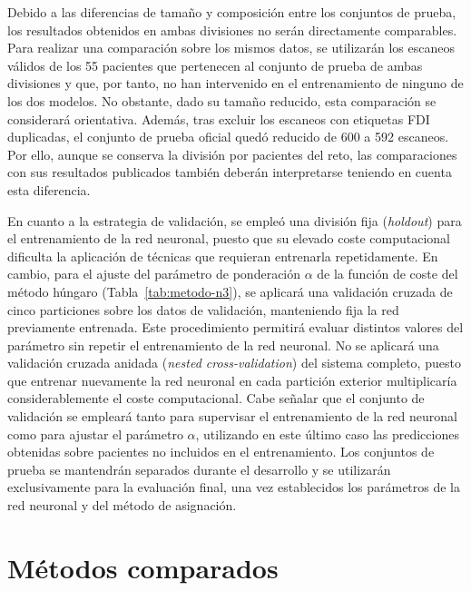 Debido a las diferencias de tamaño y composición entre los conjuntos de prueba, los resultados obtenidos en ambas divisiones no serán directamente comparables. Para realizar una comparación sobre los mismos datos, se utilizarán los escaneos válidos de los 55 pacientes que pertenecen al conjunto de prueba de ambas divisiones y que, por tanto, no han intervenido en el entrenamiento de ninguno de los dos modelos. No obstante, dado su tamaño reducido, esta comparación se considerará orientativa. Además, tras excluir los escaneos con etiquetas FDI duplicadas, el conjunto de prueba oficial quedó reducido de 600 a 592 escaneos. Por ello, aunque se conserva la división por pacientes del reto, las comparaciones con sus resultados publicados también deberán interpretarse teniendo en cuenta esta diferencia.

En cuanto a la estrategia de validación, se empleó una división fija (\textit{holdout}) para el entrenamiento de la red neuronal, puesto que su elevado coste computacional dificulta la aplicación de técnicas que requieran entrenarla repetidamente. En cambio, para el ajuste del parámetro de ponderación $\alpha$ de la función de coste del método húngaro (Tabla~\ref{tab:metodo-n3}), se aplicará una validación cruzada de cinco particiones sobre los datos de validación, manteniendo fija la red previamente entrenada. Este procedimiento permitirá evaluar distintos valores del parámetro sin repetir el entrenamiento de la red neuronal. No se aplicará una validación cruzada anidada (\textit{nested cross-validation}) del sistema completo, puesto que entrenar nuevamente la red neuronal en cada partición exterior multiplicaría considerablemente el coste computacional. Cabe señalar que el conjunto de validación se empleará tanto para supervisar el entrenamiento de la red neuronal como para ajustar el parámetro $\alpha$, utilizando en este último caso las predicciones obtenidas sobre pacientes no incluidos en el entrenamiento. Los conjuntos de prueba se mantendrán separados durante el desarrollo y se utilizarán exclusivamente para la evaluación final, una vez establecidos los parámetros de la red neuronal y del método de asignación.

\section{Métodos comparados}
\label{sec:metodos}


